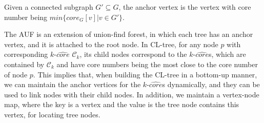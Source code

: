 \begin{definition}
\label{def:anchor}
Given a connected subgraph $G'\subseteq G$,
the anchor vertex is the vertex with core number being $min\{core_G[v]|v\in G'\}$.
\end{definition}

The AUF is an extension of union-find forest, in which each tree has an anchor vertex,
and it is attached to the root node.
In CL-tree, for any node $p$ with corresponding $k$-$\widehat {core}$ ${\mathcal C}_k$,
its child nodes correspond to the $k$-$\widehat {core}$s,
which are contained by ${\mathcal C}_k$ and have core numbers being the most close to the core number of node $p$.
This implies that, when building the CL-tree in a bottom-up manner,
we can maintain the anchor vertices for the $k$-$\widehat {core}$s dynamically,
and they can be used to link nodes with their child nodes.
In addition, we maintain a vertex-node map,
where the key is a vertex and the value is the tree node contains this vertex,
for locating tree nodes.

